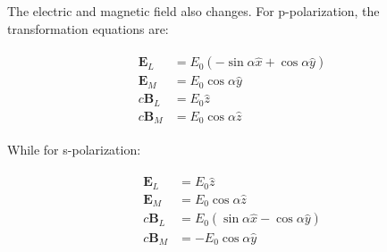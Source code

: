 The electric and magnetic field also changes. For p-polarization, the transformation equations are:

\begin{align}
    \label{eq:field-p}
    \begin{split}
        \mathbf{E}_L  & = E_0(-\sin\alpha \hat{x} + \cos\alpha \hat{y}) \\
        \mathbf{E}_M  & = E_0\cos\alpha \hat{y}                         \\
        c\mathbf{B}_L & = E_0\hat{z}                                    \\
        c\mathbf{B}_M & = E_0\cos\alpha \hat{z}
    \end{split}
\end{align}

While for s-polarization:

\begin{align}
    \label{eq:field-s}
    \begin{split}
        \mathbf{E}_L & = E_0\hat{z}                                    \\
        \mathbf{E}_M & = E_0\cos\alpha \hat{z}                        \\
        c\mathbf{B}_L & = E_0(\sin\alpha \hat{x} - \cos\alpha \hat{y}) \\
        c\mathbf{B}_M & = -E_0\cos\alpha \hat{y}
    \end{split}
\end{align}

